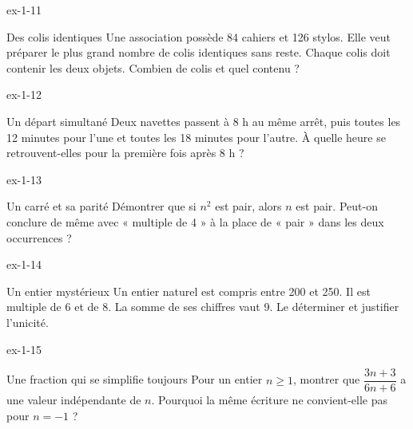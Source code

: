\clearpage{}
\begin{blocLivre}{ex-1-11}
\begin{exercice}[3]{Des colis identiques}
Une association possède 84 cahiers et 126 stylos. Elle veut préparer le plus grand nombre de colis identiques sans reste. Chaque colis doit contenir les deux objets. Combien de colis et quel contenu ?
\end{exercice}
\end{blocLivre}
\begin{blocLivre}{ex-1-12}
\begin{exercice}[3]{Un départ simultané}
Deux navettes passent à 8 h au même arrêt, puis toutes les 12 minutes pour l’une et toutes les 18 minutes pour l’autre. À quelle heure se retrouvent-elles pour la première fois après 8 h ?
\end{exercice}
\end{blocLivre}
\begin{blocLivre}{ex-1-13}
\begin{exercice}[3]{Un carré et sa parité}
Démontrer que si $n^2$ est pair, alors $n$ est pair. Peut-on conclure de même avec « multiple de 4 » à la place de « pair » dans les deux occurrences ?
\end{exercice}
\end{blocLivre}
\begin{blocLivre}{ex-1-14}
\begin{exercice}[3]{Un entier mystérieux}
Un entier naturel est compris entre 200 et 250. Il est multiple de 6 et de 8. La somme de ses chiffres vaut 9. Le déterminer et justifier l’unicité.
\end{exercice}
\end{blocLivre}
\begin{blocLivre}{ex-1-15}
\begin{exercice}[3]{Une fraction qui se simplifie toujours}
Pour un entier $n\ge1$, montrer que $\dfrac{3n+3}{6n+6}$ a une valeur indépendante de $n$. Pourquoi la même écriture ne convient-elle pas pour $n=-1$ ?
\end{exercice}
\end{blocLivre}

\clearpage
